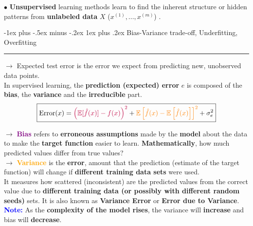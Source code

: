 \documentclass[letterpaper, 10.5pt,landscape]{article}
\makeatletter
\def\mathcolor#1#{\@mathcolor{#1}}
\def\@mathcolor#1#2#3{%
  \protect\leavevmode
  \begingroup
    \color#1{#2}#3%
  \endgroup
}
\renewcommand{\subsubsection}{\@startsection{subsubsection}{3}{0mm}%
                                {-1ex plus -.5ex minus -.2ex}%
                                {1ex plus .2ex}%
                                {\normalfont\small\bfseries}}
\makeatother
\begin{document}
\begin{multicols*}{3}
$\bullet$ \textbf{Unsupervised} learning methods learn to find the inherent structure or hidden patterns from \textbf{unlabeled data} 
 $X$ (\(x^{(1)}, ..., x^{(m)}\)) . 















\subsubsection{Bias-Variance trade-off, Underfitting, Overfitting} {\color{teal}\hrule height 0.5pt} \smallskip

$\rightarrow$ Expected test error is the error we expect from predicting new, unobserved data points. \\
In supervised learning, the \textbf{prediction (expected) error} $e$ is composed of the \textbf{bias}, the \textbf{variance} and the \textbf{irreducible} part.  
\vspace{-3pt}
\[\boxed{\text{Error}(x) =  \mathcolor{purple}{\left(\mathbb{E}[\hat{f}(x)] - f(x)\right)^{2}} + \mathcolor{orange}{\mathbb{E} \left[\hat{f}(x)- \mathbb{E}\left[\hat{f}(x)\right] \right]^{2}} + \sigma^{2}_{e}}\]
\vspace{-5pt}

$\rightarrow$ \textbf{\textcolor{purple}{Bias}} refers to \textbf{erroneous assumptions} made by the \textbf{model} about the data to make the \textbf{target function} easier to learn. \textbf{Mathematically}, how much predicted values differ from true values?
\\
$\rightarrow$ \textbf{\textcolor{orange}{Variance}} is the \textbf{error}, amount that the prediction (estimate of the target function) will change if \textbf{different training data sets} were used. \\

It measures how scattered (inconsistent) are the predicted values from the correct value due to \textbf{different training data (or possibly with different random seeds)} sets. It is also known as \textbf{Variance Error} or \textbf{Error due to Variance}. \\

\textbf{\textcolor{blue}{Note:}} As the \textbf{complexity of the model rises}, the variance will \textbf{increase} and bias will \textbf{decrease}.  \\


\end{multicols*}
\end{document}
